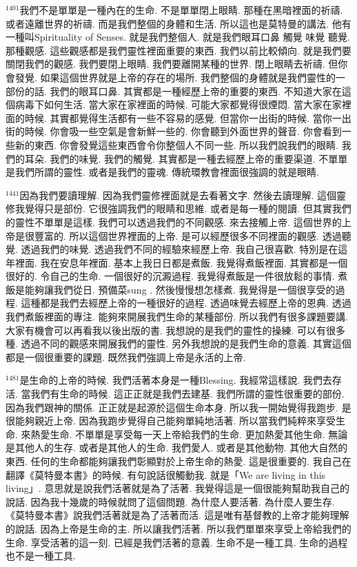 \documentclass{book}
\begin{document}
$^{1401}$我們不是單單是一種內在的生命.
不是單單閉上眼睛.
那種在黑暗裡面的祈禱.
或者遠離世界的祈禱.
而是我們整個的身體和生活.
所以這也是莫特曼的講法.
他有一種叫Spirituality of Senses.
就是我們整個人.
就是我們眼耳口鼻 觸覺 味覺 聽覺.
那種觀感.
這些觀感都是我們靈性裡面重要的東西.
我們以前比較傾向.
就是我們要關閉我們的觀感.
我們要閉上眼睛.
我們要離開某種的世界.
閉上眼睛去祈禱.
但你會發覺.
如果這個世界就是上帝的存在的場所.
我們整個的身體就是我們靈性的一部份的話.
我們的眼耳口鼻.
其實都是一種經歷上帝的重要的東西.
不知道大家在這個病毒下如何生活.
當大家在家裡面的時候.
可能大家都覺得很煙悶.
當大家在家裡面的時候.
其實都覺得生活都有一些不容易的感覺.
但當你一出街的時候.
當你一出街的時候.
你會吸一些空氣是會新鮮一些的.
你會聽到外面世界的聲音.
你會看到一些新的東西.
你會發覺這些東西會令你整個人不同一些.
所以我們說我們的眼睛.
我們的耳朵.
我們的味覺.
我們的觸覺.
其實都是一種去經歷上帝的重要渠道.
不單單是我們所謂的靈性.
或者是我們的靈魂.
傳統環教會裡面很強調的就是眼睛.

$^{1441}$因為我們要讀理解.
因為我們靈修裡面就是去看著文字.
然後去讀理解.
這個靈修我覺得只是部份.
它很強調我們的眼睛和思維.
或者是每一種的閱讀.
但其實我們的靈性不單單是這樣.
我們可以透過我們的不同觀感.
來去接觸上帝.
這個世界的上帝是很豐富的.
所以這個世界裡面的上帝.
是可以經歷很多不同裡面的觀感.
透過聽覺.
透過我們的味覺.
透過我們不同的經驗來經歷上帝.
我自己很喜歡.
特別是在這年裡面.
我在安息年裡面.
基本上我日日都是煮飯.
我覺得煮飯裡面.
其實都是一個很好的.
令自己的生命.
一個很好的沉澱過程.
我覺得煮飯是一件很放鬆的事情.
煮飯是能夠讓我們從日.
預備菜sung .
然後慢慢想怎樣煮.
我覺得是一個很享受的過程.
這種都是我們去經歷上帝的一種很好的過程.
透過味覺去經歷上帝的恩典.
透過我們煮飯裡面的專注.
能夠來開展我們生命的某種部份.
所以我們有很多課題要講.
大家有機會可以再看我以後出版的書.
我想說的是我們的靈性的操練.
可以有很多種.
透過不同的觀感來開展我們的靈性.
另外我想說的是我們生命的意義.
其實這個都是一個很重要的課題.
既然我們強調上帝是永活的上帝.

$^{1481}$是生命的上帝的時候.
我們活著本身是一種Blessing.
我經常這樣說.
我們去存活.
當我們有生命的時候.
這正正就是我們去建基.
我們所謂的靈性很重要的部份.
因為我們跟神的關係.
正正就是起源於這個生命本身.
所以我一開始覺得我跑步.
是很能夠親近上帝.
因為我跑步覺得自己能夠單純地活著.
所以當我們純粹來享受生命.
來熱愛生命.
不單單是享受每一天上帝給我們的生命.
更加熱愛其他生命.
無論是其他人的生存.
或者是其他人的生命.
我們愛人.
或者是其他動物.
其他大自然的東西.
任何的生命都能夠讓我們彰顯對於上帝生命的熱愛.
這是很重要的.
我自己在翻譯《莫特曼本書》的時候.
有句說話很觸動我.
就是「We are living in this living」.
意思就是說我們活著就是為了活著.
我覺得這是一個很能夠幫助我自己的說話.
因為我十幾歲的時候就問了這個問題.
為什麼人要活著.
為什麼人要生存.
《莫特曼本書》說我們活著就是為了活著而活.
這是唯有基督教的上帝才能夠理解的說話.
因為上帝是生命的主.
所以讓我們活著.
所以我們單單來享受上帝給我們的生命.
享受活著的這一刻.
已經是我們活著的意義.
生命不是一種工具.
生命的過程也不是一種工具.
\end{document}
